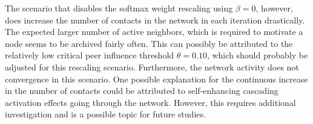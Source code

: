 The scenario that disables the softmax weight rescaling using \( \beta = 0 \), however, does increase the number of contacts in the network in each iteration drastically.
The expected larger number of active neighbors, which is required to motivate a node seems to be archived fairly often.
This can possibly be attributed to the relatively low critical peer influence threshold \( \theta = 0.10 \), which should probably be adjusted for this rescaling scenario.
Furthermore, the network activity does not convergence in this scenario.
One possible explanation for the continuous increase in the number of contacts could be attributed to self-enhancing cascading activation effects going through the network.
However, this requires additional investigation and is a possible topic for future studies.

